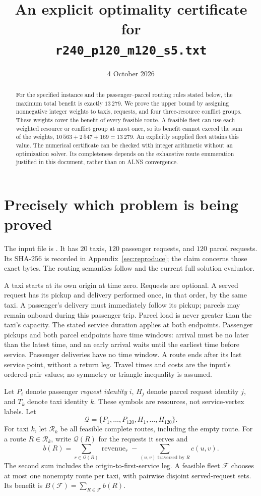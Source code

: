\documentclass[11pt,a4paper]{article}
\title{An explicit optimality certificate for\\
\texttt{r240\_p120\_m120\_s5.txt}}
\author{}
\date{4 October 2026}
\newcommand{\R}{\mathcal R}
\newcommand{\Q}{\mathcal Q}
\newcommand{\F}{\mathcal F}
\begin{document}
\maketitle

\begin{abstract}
For the specified instance and the passenger--parcel routing rules stated
below, the maximum total benefit is exactly $13\,279$. We prove the upper
bound by assigning nonnegative integer weights to taxis, requests, and four
three-resource conflict groups. These weights cover the benefit of every
feasible route. A feasible fleet can use each weighted resource or conflict
group at most once, so its benefit cannot exceed the sum of the weights,
$10\,563+2\,547+169=13\,279$. An explicitly supplied fleet attains this value.
The numerical certificate can be checked with integer arithmetic without
an optimization solver. Its completeness depends on the exhaustive route
enumeration justified in this document, rather than on ALNS convergence.
\end{abstract}

\section{Precisely which problem is being proved}

The input file is . It has $20$
taxis, $120$ passenger requests, and $120$ parcel requests. Its SHA-256 is
recorded in Appendix~\ref{sec:reproduce}; the claim concerns those exact bytes.
The routing semantics follow  and the current full
solution evaluator.

A taxi starts at its own origin at time zero. Requests are optional. A served
request has its pickup and delivery performed once, in that order, by the
same taxi. A passenger's delivery must immediately follow its pickup;
parcels may remain onboard during this passenger trip. Parcel load is never
greater than the taxi's capacity. The stated service duration applies at
both endpoints. Passenger pickups and both parcel endpoints have time
windows: arrival must be no later than the latest time, and an early arrival
waits until the earliest time before service. Passenger deliveries have no
time window. A route ends after its last service point, without a return leg.
Travel times and costs are the input's ordered-pair values; no symmetry or
triangle inequality is assumed.

Let $P_i$ denote passenger \emph{request identity} $i$, $H_j$ denote parcel
request identity $j$, and $T_k$ denote taxi identity $k$. These symbols are
resources, not service-vertex labels. Let
\[
 \Q=\{P_1,\ldots,P_{120},H_1,\ldots,H_{120}\}.
\]
For taxi $k$, let $\R_k$ be all feasible complete routes, including the empty
route. For a route $R\in\R_k$, write $\Q(R)$ for the requests it serves and
\[
 b(R)=\sum_{r\in\Q(R)}\operatorname{revenue}_r
       -\sum_{(u,v)\text{ traversed by }R}c(u,v).
\]
The second sum includes the origin-to-first-service leg. A feasible fleet
$\F$ chooses at most one nonempty route per taxi, with pairwise disjoint
served-request sets. Its benefit is $B(\F)=\sum_{R\in\F}b(R)$.
\end{document}
